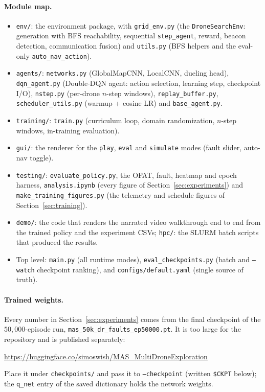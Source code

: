\paragraph{Module map.}
\begin{itemize}[leftmargin=1.5em]
  \item \texttt{env/}: the environment package, with \texttt{grid\_env.py}
    (the \texttt{DroneSearchEnv}: generation with BFS reachability, sequential
    \texttt{step\_agent}, reward, beacon detection, communication fusion) and
    \texttt{utils.py} (BFS helpers and the eval-only \texttt{auto\_nav\_action}).
  \item \texttt{agents/}: \texttt{networks.py} (GlobalMapCNN, LocalCNN,
    dueling head), \texttt{dqn\_agent.py} (Double-DQN agent: action
    selection, learning step, checkpoint I/O), \texttt{nstep.py} (per-drone
    $n$-step windows), \texttt{replay\_buffer.py}, \texttt{scheduler\_utils.py}
    (warmup + cosine LR) and \texttt{base\_agent.py}.
  \item \texttt{training/}: \texttt{train.py} (curriculum loop, domain
    randomization, $n$-step windows, in-training evaluation).
  \item \texttt{gui/}: the renderer for the \texttt{play}, \texttt{eval}
    and \texttt{simulate} modes (fault slider, auto-nav toggle).
  \item \texttt{testing/}: \texttt{evaluate\_\allowbreak policy.py}, the OFAT,
    fault, heatmap and epoch harness, \texttt{analysis.\allowbreak ipynb}
    (every figure of Section~\ref{sec:experiments}) and
    \texttt{make\_\allowbreak training\_\allowbreak figures.py} (the telemetry
    and schedule figures of Section~\ref{sec:training}).
  \item \texttt{demo/}: the code that renders the narrated video walkthrough
    end to end from the trained policy and the experiment CSVs; \texttt{hpc/}:
    the SLURM batch scripts that produced the results.
  \item Top level: \texttt{main.py} (all runtime modes),
    \texttt{eval\_checkpoints.py} (batch and \texttt{--watch} checkpoint
    ranking), and \texttt{configs/default.yaml} (single source of truth).
\end{itemize}

\paragraph{Trained weights.}
Every number in Section~\ref{sec:experiments} comes from the final checkpoint of
the $50{,}000$-episode run,
\texttt{mas\_\allowbreak 50k\_\allowbreak dr\_\allowbreak faults\_\allowbreak ep50000.pt}.
It is too large for the repository and is published separately:
\begin{center}\footnotesize{}
\url{https://huggingface.co/simoswish/MAS_MultiDroneExploration}
\end{center}
Place it under \texttt{checkpoints/} and pass it to \texttt{--checkpoint}
(written \texttt{\$CKPT} below); the \texttt{q\_net} entry of the saved
dictionary holds the network weights.

